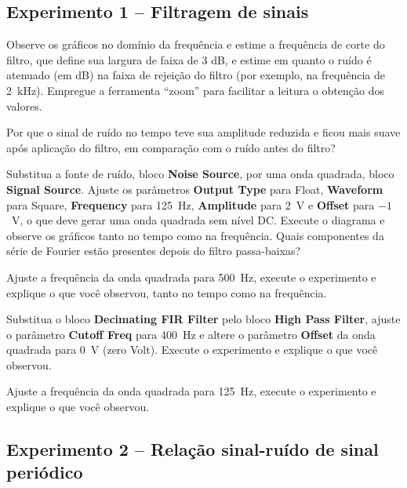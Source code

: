 \documentclass[12pt,addpoints]{exam}
\begin{document}
\subsection*{Experimento 1 -- Filtragem de sinais}

\begin{questions}
    \question Observe os gráficos no domínio da frequência e estime a frequência de corte do filtro, que define sua largura de faixa de 3 dB, e estime em quanto o ruído é atenuado (em dB) na faixa de rejeição do filtro (por exemplo, na frequência de 2~kHz). Empregue a ferramenta ``zoom'' para facilitar a leitura o obtenção dos valores.
    \fillwithlines{0.25in}
    
    \question Por que o sinal de ruído no tempo teve sua amplitude reduzida e ficou mais suave após aplicação do filtro, em comparação com o ruído antes do filtro?
    \fillwithlines{0.5in}

    \question Substitua a fonte de ruído, bloco \textbf{Noise Source}, por uma onda quadrada, bloco \textbf{Signal Source}. Ajuste os parâmetros \textbf{Output Type} para Float, \textbf{Waveform} para Square, \textbf{Frequency} para 125~Hz, \textbf{Amplitude} para 2~V e \textbf{Offset} para $-1$~V, o que deve gerar uma onda quadrada sem nível DC. Execute o diagrama e observe os gráficos tanto no tempo como na frequência. Quais componentes da série de Fourier estão presentes depois do filtro passa-baixas?
    \fillwithlines{0.5in}
    
    \question Ajuste a frequência da onda quadrada para 500~Hz, execute o experimento e explique o que você observou, tanto no tempo como na frequência.
    \fillwithlines{0.5in}
    
    \question Substitua o bloco \textbf{Decimating FIR Filter} pelo bloco \textbf{High Pass Filter}, ajuste o parâmetro \textbf{Cutoff Freq} para 400~Hz e altere o parâmetro \textbf{Offset} da onda quadrada para 0~V (zero Volt). Execute o experimento e explique o que você observou.
    \fillwithlines{0.5in}
    
    \question Ajuste a frequência da onda quadrada para 125~Hz, execute o experimento e explique o que você observou.
    \fillwithlines{0.5in}
\end{questions}

\subsection*{Experimento 2 -- Relação sinal-ruído de sinal periódico}
\end{document}
